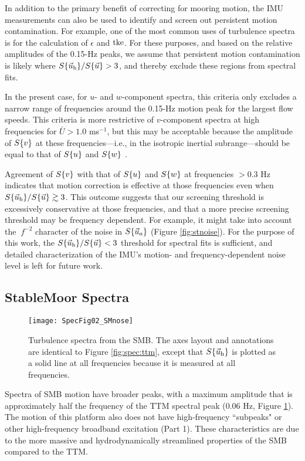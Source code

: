 In addition to the primary benefit of correcting for mooring motion, the IMU measurements can also be used to identify and screen out persistent motion contamination. For example, one of the most common uses of turbulence spectra is for the calculation of $\epsilon$ and $\mathrm{tke}$. For these purposes, and based on the relative amplitudes of the 0.15-Hz peaks, we assume that persistent motion contamination is likely where $S\{\vec{u}_{\mathrm{h}}\}/S\{\vec{u}\} > 3$, and thereby exclude these regions from spectral fits.

In the present case, for $u$- and $w$-component spectra, this criteria only excludes a narrow range of frequencies around the 0.15-Hz motion peak for the largest flow speeds. This criteria is more restrictive of $v$-component spectra at high frequencies for $\bar U > 1.0$ ms$^{-1}$, but this may be acceptable because the amplitude of $S\{v\}$ at these frequencies---i.e., in the isotropic inertial subrange---should be equal to that of $S\{u\}$ and $S\{w\}$ \cite[]{Kolmogorov1941c}.

Agreement of $S\{v\}$ with that of $S\{u\}$ and $S\{w\}$ at frequencies $>0.3$ Hz indicates that motion correction is effective at those frequencies even when $S\{\vec{u}_{\mathrm{h}}\}/S\{\vec{u}\} \gtrsim 3$. This outcome suggests that our screening threshold is excessively conservative at those frequencies, and that a more precise screening threshold may be frequency dependent. For example, it might take into account the $~f^{-2}$ character of the noise in $S\{\vec{u}_a\}$ (Figure \ref{fig:stnoise}). For the purpose of this work, the $S\{\vec{u}_{\mathrm{h}}\}/S\{\vec{u}\} < 3$ threshold for spectral fits is sufficient, and detailed characterization of the IMU's motion- and frequency-dependent noise level is left for future work.

\subsection{StableMoor Spectra}

\begin{figure*}[th]
  \centering
  \texttt{[image: SpecFig02\_SMnose]}
  \caption{Turbulence spectra from the SMB. The axes layout and annotations are identical to Figure \ref{fig:spec:ttm}, except that $S\{\vec{u}_{\mathrm{h}}\}$ is plotted as a solid line at all frequencies because it is measured at all frequencies. }
  \label{fig:spec:sm}
\end{figure*}

Spectra of SMB motion have broader peaks, with a maximum amplitude that is approximately half the frequency of the TTM spectral peak (0.06 Hz, Figure \ref{fig:spec:sm}). The motion of this platform also does not have high-frequency ``subpeaks" or other high-frequency broadband excitation (Part 1).  These characteristics are due to the more massive and hydrodynamically streamlined properties of the SMB compared to the TTM. 

